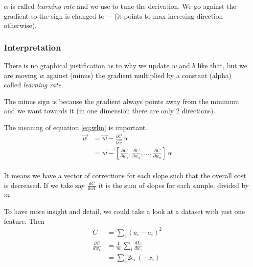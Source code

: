 $\alpha$ is called \textit{learning rate} and we use to tune the derivation. We go against the gradient so the sign is changed to $-$ (it points to max incresing direction otherwise).

\subsubsection{Interpretation}

There is no graphical justification as to why we update $w$ and $b$ like that, but we are moving $w$ against (minus) the gradient multiplied by a constant (alpha) called \textit{learning rate}.

The minus sign is because the gradient always points away from the minimum and we want towards it (in one dimension there are only 2 directions). 

The meaning of equation \ref{eq:wlin} is important.
\begin{align}
  \vec{w} &= \vec{w} -\frac{\partial C}{\partial \vec{w}}\,\alpha\\
  &= \vec{w} -[\frac{\partial C}{\partial w_1}, \frac{\partial C}{\partial w_2},\ldots, \frac{\partial C}{\partial w_n}]\,\alpha\\
\end{align}

It means we have a vector of corrections for each slope such that the overall cost is decreased. If we take say $\frac{dC}{dw1}$ it is the sum of slopes for each sample, divided by $m$. 

To have more insight and detail, we could take a look at a dataset with just one feature. Then 
\begin{align}
  C &= \sum_i(a_i - a_i)^2 \\ 
  \frac{\partial C}{dw_1}&= \frac{1}{m}\,\sum_i \frac{dL_i}{dw_1} \\
  &= \sum_i 2\epsilon_i\,(-x_i)
\end{align}



